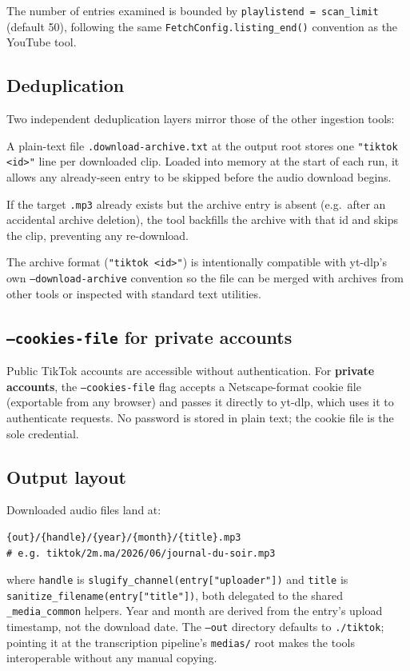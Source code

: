 \documentclass[11pt,a4paper]{report}
\newcommand{\code}[1]{\texttt{\small #1}}
\begin{document}
The number of entries examined is bounded by
\code{playlistend = scan\_limit} (default 50), following the same
\code{FetchConfig.listing\_end()} convention as the YouTube tool.

\subsection{Deduplication}

Two independent deduplication layers mirror those of the other ingestion tools:

\begin{description}[leftmargin=2em,style=nextline]
  \item[Download archive] A plain-text file \code{.download-archive.txt} at the
        output root stores one \code{"tiktok <id>"} line per downloaded clip.
        Loaded into memory at the start of each run, it allows any already-seen
        entry to be skipped before the audio download begins.
  \item[Filesystem check] If the target \code{.mp3} already exists but the
        archive entry is absent (e.g.\ after an accidental archive deletion), the
        tool backfills the archive with that id and skips the clip, preventing any
        re-download.
\end{description}

The archive format (\code{"tiktok <id>"}) is intentionally compatible with
yt-dlp's own \code{--download-archive} convention so the file can be merged with
archives from other tools or inspected with standard text utilities.

\subsection{\texttt{--cookies-file} for private accounts}

Public TikTok accounts are accessible without authentication.  For \textbf{private
accounts}, the \code{--cookies-file} flag accepts a Netscape-format cookie file
(exportable from any browser) and passes it directly to yt-dlp, which uses it to
authenticate requests.  No password is stored in plain text; the cookie file is
the sole credential.

\subsection{Output layout}

Downloaded audio files land at:
\begin{lstlisting}[style=sh, numbers=none]
{out}/{handle}/{year}/{month}/{title}.mp3
# e.g. tiktok/2m.ma/2026/06/journal-du-soir.mp3
\end{lstlisting}
where \code{handle} is \code{slugify\_channel(entry["uploader"])} and
\code{title} is \code{sanitize\_filename(entry["title"])}, both delegated to the
shared \code{\_media\_common} helpers.  Year and month are derived from the
entry's upload timestamp, not the download date.  The \code{--out} directory
defaults to \code{./tiktok}; pointing it at the transcription pipeline's
\code{medias/} root makes the tools interoperable without any manual copying.
\end{document}
